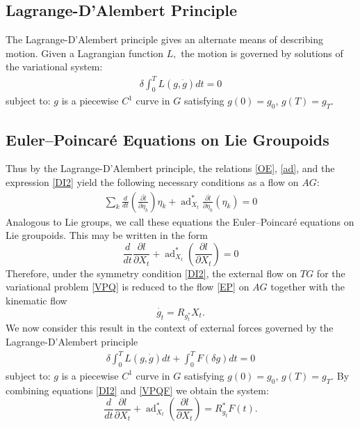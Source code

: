 \documentclass{article}
\begin{document}
\subsection{Lagrange-D'Alembert Principle}

The Lagrange-D'Alembert principle gives an alternate means of describing motion. Given a Lagrangian function $L,$ the motion is governed by solutions of the variational system:
\begin{eqnarray}\label{VPQ2}
\delta \int^T_0L(g, \dot{g})dt=0
\end{eqnarray}
subject to: $g$ is a piecewise $C^1$ curve in $G$ satisfying $g(0)=g_0$, $g(T)=g_T.$

\subsection{Euler--Poincar\'e Equations on Lie Groupoids}

Thus by the Lagrange-D'Alembert principle, the relations \ref{OE}, \ref{ad}, and the expression \ref{DI2} yield the following necessary conditions as a flow on $AG:$ 
\begin{eqnarray}
\sum_k \frac{d}{dt}\left(\frac{\partial\hat{l}}{\partial{\eta_k}}\right)\eta_k + \operatorname{ad}^*_{X_t}\frac{\partial\hat{l}}{\partial{\eta_k}}(\eta_k)=0\nonumber
\end{eqnarray}
Analogous to Lie groups, we call these equations the Euler--Poincar\'e equations on Lie groupoids. This may be written in the form 
\begin{equation}\label{EP}
\frac{d}{dt}\frac{\partial l}{\partial{X_t}} + \operatorname{ad}^*_{X_t}\left(\frac{\partial l}{\partial{X_t}}\right)=0
\end{equation}
Therefore, under the symmetry condition \ref{DI2}, the external flow on $TG$ for the variational problem \ref{VPQ} is reduced to the flow \ref{EP} on $AG$ together with the kinematic flow 
\begin{equation}
\dot{g_t}=R_{g_t^*}X_t.
\end{equation}
We now consider this result in the context of external forces governed by the Lagrange-D'Alembert principle
\begin{eqnarray}\label{VPQF}
\delta \int^T_0L(g, \dot{g})dt+\int^T_0F(\delta g)dt=0
\end{eqnarray}
subject to: $g$ is a piecewise $C^1$ curve in $G$ satisfying $g(0)=g_0$, $g(T)=g_T.$
By combining equations \ref{DI2} and \ref{VPQF} we obtain the system:
\begin{equation}\label{EPF}
\frac{d}{dt}\frac{\partial l}{\partial{X_t}} + \operatorname{ad}^*_{X_t}\left(\frac{\partial l}{\partial{X_t}}\right) = R^*_{g_t}F(t).
\end{equation}
\end{document}
